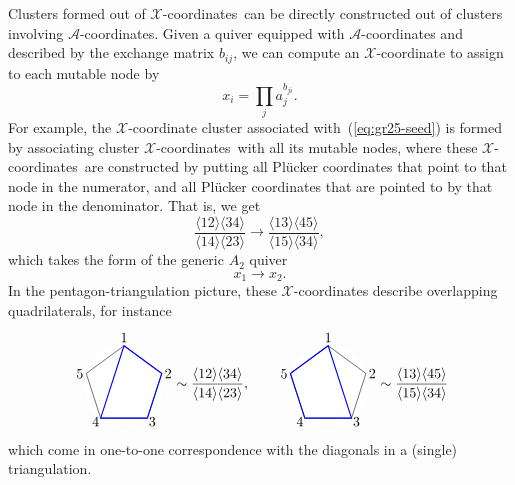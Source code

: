 \documentclass[12pt]{article}
\def\ket#1{\langle #1 \rangle}
\def\x{\mathcal{X}}
\def\xcoords{$\mathcal{X}$-coordinates}
\def\a{\mathcal{A}}
\def\acoords{$\mathcal{A}$-coordinates}
\def\drawLabeledPentagon{
\coordinate (P1) at (90:1);
\coordinate (P2) at (18:1);
\coordinate (P3) at (306:1);
\coordinate (P4) at (234:1);
\coordinate (P5) at (162:1);
\draw[white,fill=white] (0,0) circle (1cm);
\draw (P1) -- (P2) -- (P3) -- (P4) -- (P5) -- cycle;
\draw (0,1.2) node {1};
\draw (.9,.3) node[anchor=west] {2};
\draw (.5,-.9) node[anchor=west] {3};
\draw (-.5,-.9) node[anchor=east] {4};
\draw (-.9,.3) node[anchor=east] {5};
}
\begin{document}
Clusters formed out of \xcoords\ can be directly constructed out of clusters involving \acoords. Given a quiver equipped with $\a$-coordinates and described by the exchange matrix $b_{ij}$, we can compute an $\x$-coordinate to assign to each mutable node by
\begin{equation} \label{eq:x_from_a_coordinates}
	x_i = \prod_j a_j^{b_{ji}}. 	
\end{equation} 
For example, the $\x$-coordinate cluster associated with~(\ref{eq:gr25-seed}) is formed by associating cluster \xcoords\ with all its mutable nodes, where these \xcoords\ are constructed by putting all Pl\"ucker coordinates that point to that node in the numerator, and all Pl\"ucker coordinates that are pointed to by that node in the denominator. That is, we get
\begin{equation} \label{eq:a2_x_seed}
	\frac{\ket{12}\ket{34}}{\ket{14}\ket{23}} \to \frac{\ket{13}\ket{45}}{\ket{15}\ket{34}},
\end{equation}
which takes the form of the generic $A_2$ quiver
\begin{equation} \label{def:xcoordsA2}
	x_1 \to x_2.
\end{equation}
In the pentagon-triangulation picture, these $\x$-coordinates describe overlapping quadrilaterals, for instance
\begin{align}\begin{gathered}
\begin{tikzpicture}
  \drawLabeledPentagon
  \draw[color=blue, thick] (P1) -- (P2) -- (P3) -- (P4) -- cycle;
\end{tikzpicture} 
\begin{aligned}
\sim \frac{\ket{12}\ket{34}}{\ket{14}\ket{23}},  \\[1.6cm] \
\end{aligned} \qquad 
\begin{tikzpicture}
  \drawLabeledPentagon
  \draw[color=blue, thick] (P1) -- (P3) -- (P4) -- (P5) -- cycle;
\end{tikzpicture}  
\begin{aligned}
\sim \frac{\ket{13}\ket{45}}{\ket{15}\ket{34}} \\[1.6cm] \
\end{aligned}
\vspace{-1.4cm}
\end{gathered}
\end{align}
which come in one-to-one correspondence with the diagonals in a (single) triangulation.
\end{document}
